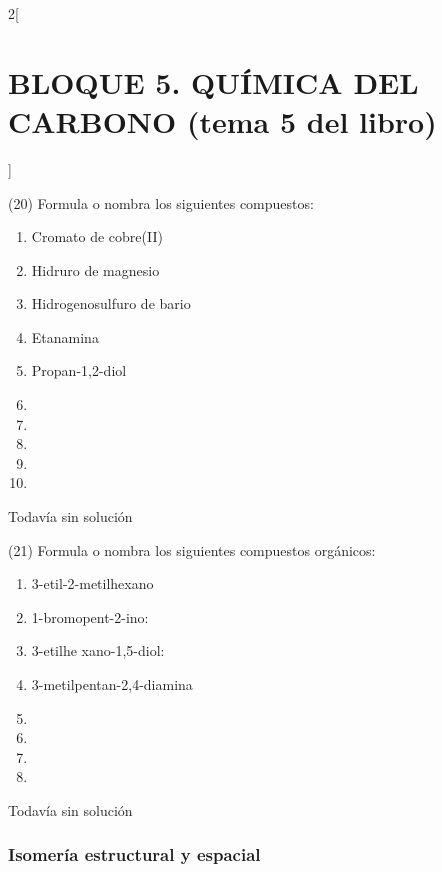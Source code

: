 \documentclass[10pt]{article}
\begin{document}
\begin{multicols}{2}[
  \section{BLOQUE 5. QUÍMICA DEL CARBONO (tema 5 del libro)}
  ]
\begin{exercise}[
    tags    = {},
    topics  = {química,química básica},
    source  = {FQ 1B MGH 2016, p85, e26},
  ]
  (20) Formula o nombra los siguientes compuestos:
  \begin{enumerate}
    \item Cromato de cobre(II)
    \item Hidruro de magnesio
    \item Hidrogenosulfuro de bario
    \item Etanamina
    \item Propan-1,2-diol
    \item {}
    \item {}
    \item {}
    \item {}
    \item {}
  \end{enumerate}
\end{exercise}

\begin{solution}[print=false]
  Todavía sin solución
\end{solution}




\begin{exercise}[
    tags    = {},
    topics  = {química,química básica},
    source  = {FQ 1B MGH 2016, p85, e26},
  ]

  (21) Formula o nombra los siguientes compuestos orgánicos:
  \begin{enumerate}
    \item 3-etil-2-metilhexano
    \item 1-bromopent-2-ino:
    \item 3-etilhe xano-1,5-diol:
    \item 3-metilpentan-2,4-diamina
    \item {}
    \item {}
    \item {}
    \item {}
  \end{enumerate}
\end{exercise}

\begin{solution}[print=false]
  Todavía sin solución
\end{solution}

\subsubsection{Isomería estructural y espacial}





\end{multicols}
\end{document}
